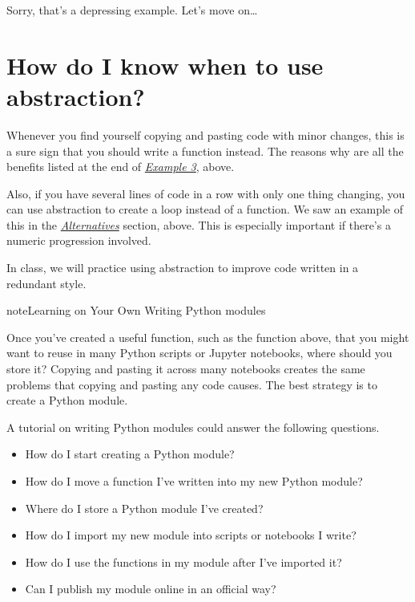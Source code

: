 \documentclass[letterpaper,10pt,english]{jupyterBook}
\begin{document}
\sphinxAtStartPar
Sorry, that’s a depressing example.  Let’s move on…


\section{How do I know when to use abstraction?}
\label{\detokenize{chapter-7-abstraction:how-do-i-know-when-to-use-abstraction}}
\sphinxAtStartPar
Whenever you find yourself copying and pasting code with minor changes, this is a sure sign that you should write a function instead.  The reasons why are all the benefits listed at the end of {\hyperref[\detokenize{chapter-7-abstraction:example-3-copying-and-pasting-code}]{\emph{Example 3}}}, above.

\sphinxAtStartPar
Also, if you have several lines of code in a row with only one thing changing, you can use abstraction to create a loop instead of a function.  We saw an example of this in the {\hyperref[\detokenize{chapter-7-abstraction:alternatives}]{\emph{Alternatives}}} section, above.  This is especially important if there’s a numeric progression involved.

\sphinxAtStartPar
{}  In class, we will practice using abstraction to improve code written in a redundant style.

\begin{sphinxadmonition}{note}{Learning on Your Own \sphinxhyphen{} Writing Python modules}

\sphinxAtStartPar
Once you’ve created a useful function, such as the  function above, that you might want to reuse in many Python scripts or Jupyter notebooks, where should you store it?  Copying and pasting it across many notebooks creates the same problems that copying and pasting any code causes.  The best strategy is to create a Python module.
\end{sphinxadmonition}

\sphinxAtStartPar
A tutorial on writing Python modules could answer the following questions.
\begin{itemize}
\item {} 
\sphinxAtStartPar
How do I start creating a Python module?

\item {} 
\sphinxAtStartPar
How do I move a function I’ve written into my new Python module?

\item {} 
\sphinxAtStartPar
Where do I store a Python module I’ve created?

\item {} 
\sphinxAtStartPar
How do I import my new module into scripts or notebooks I write?

\item {} 
\sphinxAtStartPar
How do I use the functions in my module after I’ve imported it?

\item {} 
\sphinxAtStartPar
Can I publish my module online in an official way?

\end{itemize}
\end{document}
